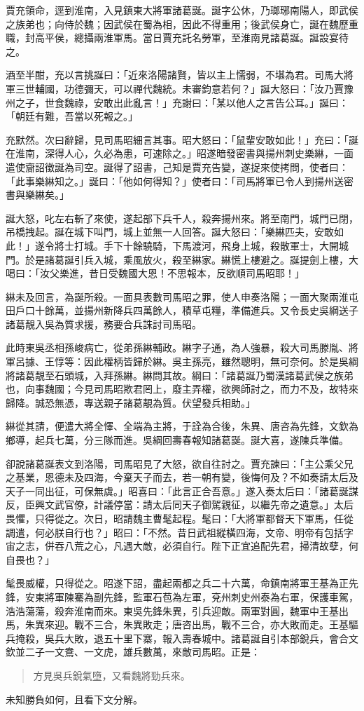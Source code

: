 賈充領命，逕到淮南，入見鎮東大將軍諸葛誕。誕字公休，乃瑯琊南陽人，即武侯之族弟也；向侍於魏；因武侯在蜀為相，因此不得重用；後武侯身亡，誕在魏歷重職，封高平侯，總攝兩淮軍馬。當日賈充託名勞軍，至淮南見諸葛誕。誕設宴待之。

酒至半酣，充以言挑誕曰：「近來洛陽諸賢，皆以主上懦弱，不堪為君。司馬大將軍三世輔國，功德彌天，可以禪代魏統。未審鈞意若何？」誕大怒曰：「汝乃賈豫州之子，世食魏祿，安敢出此亂言！」充謝曰：「某以他人之言告公耳。」誕曰：「朝廷有難，吾當以死報之。」

充默然。次曰辭歸，見司馬昭細言其事。昭大怒曰：「鼠輩安敢如此！」充曰：「誕在淮南，深得人心，久必為患，可速除之。」昭遂暗發密書與揚州刺史樂綝，一面遣使齎詔徵誕為司空。誕得了詔書，己知是賈充告變，遂捉來使拷問，使者曰：「此事樂綝知之。」誕曰：「他如何得知？」使者曰：「司馬將軍已令人到揚州送密書與樂綝矣。」

誕大怒，叱左右斬了來使，遂起部下兵千人，殺奔揚州來。將至南門，城門已閉，吊橋拽起。誕在城下叫門，城上並無一人回答。誕大怒曰：「樂綝匹夫，安敢如此！」遂令將士打城。手下十餘驍騎，下馬渡河，飛身上城，殺散軍士，大開城門。於是諸葛誕引兵入城，乘風放火，殺至綝家。綝慌上樓避之。誕提劍上樓，大喝曰：「汝父樂進，昔日受魏國大恩！不思報本，反欲順司馬昭耶！」

綝未及回言，為誕所殺。一面具表數司馬昭之罪，使人申奏洛陽；一面大聚兩淮屯田戶口十餘萬，並揚州新降兵四萬餘人，積草屯糧，準備進兵。又令長史吳綱送子諸葛靚入吳為質求援，務要合兵誅討司馬昭。

此時東吳丞相孫峻病亡，從弟孫綝輔政。綝字子通，為人強暴，殺大司馬滕胤、將軍呂據、王惇等：因此權柄皆歸於綝。吳主孫亮，雖然聰明，無可奈何。於是吳綱將諸葛靚至石頭城，入拜孫綝。綝問其故。綱曰：「諸葛誕乃蜀漢諸葛武侯之族弟也，向事魏國；今見司馬昭欺君罔上，廢主弄權，欲興師討之，而力不及，故特來歸降。誠恐無憑，專送親子諸葛靚為質。伏望發兵相助。」

綝從其請，便遣大將全懌、全端為主將，于詮為合後，朱異、唐咨為先鋒，文欽為鄉導，起兵七萬，分三隊而進。吳綱回壽春報知諸葛誕。誕大喜，遂陳兵準備。

卻說諸葛誕表文到洛陽，司馬昭見了大怒，欲自往討之。賈充諫曰：「主公乘父兄之基業，恩德未及四海，今棄天子而去，若一朝有變，後悔何及？不如奏請太后及天子一同出征，可保無虞。」昭喜曰：「此言正合吾意。」遂入奏太后曰：「諸葛誕謀反，臣興文武官僚，計議停當：請太后同天子御駕親征，以繼先帝之遺意。」太后畏懼，只得從之。次日，昭請魏主曹髦起程。髦曰：「大將軍都督天下軍馬，任從調遣，何必朕自行也？」昭曰：「不然。昔日武祖縱橫四海，文帝、明帝有包括字宙之志，併吞八荒之心，凡遇大敵，必須自行。陛下正宜追配先君，掃清故孽，何自畏也？」

髦畏威權，只得從之。昭遂下詔，盡起兩都之兵二十六萬，命鎮南將軍王基為正先鋒，安東將軍陳騫為副先鋒，監軍石苞為左軍，兗州刺史州泰為右軍，保護車駕，浩浩蕩蕩，殺奔淮南而來。東吳先鋒朱異，引兵迎敵。兩軍對圓，魏軍中王基出馬，朱異來迎。戰不三合，朱異敗走；唐咨出馬，戰不三合，亦大敗而走。王基驅兵掩殺，吳兵大敗，退五十里下寨，報入壽春城中。諸葛誕自引本部銳兵，會合文欽並二子一文鴦、一文虎，雄兵數萬，來敵司馬昭。正是：

\begin{quote}
方見吳兵銳氣墮，又看魏將勁兵來。
\end{quote}

未知勝負如何，且看下文分解。
